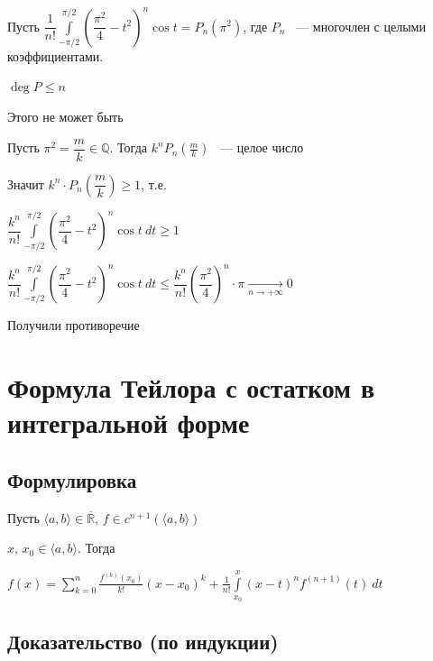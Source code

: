 \documentclass{article}
\begin{document}
			Пусть $\dfrac{1}{n!} \int\limits^{\pi / 2}_{-\pi / 2} \left(\dfrac{\pi^2}{4} - t^2\right)^n \cos t = P_n (\pi^2)$, где $P_n$ ~--- многочлен с целыми коэффициентами.
			
			$\deg P \leq n$
			
			Этого не может быть
			
			Пусть $\pi^2 = \dfrac{m}{k} \in \mathbb{Q}$. Тогда $k^n P_n\left(\frac{m}{k}\right)$ ~--- целое число
			
			Значит $k^n \cdot P_n \left(\dfrac{m}{k}\right) \geq 1$, т.е.
			
			$\dfrac{k^n}{n!} \int\limits^{\pi / 2}_{-\pi / 2} \left(\dfrac{\pi^2}{4} - t^2\right)^n \cos t \ dt \geq 1$
			
			$\dfrac{k^n}{n!} \int\limits^{\pi / 2}_{-\pi / 2} \left(\dfrac{\pi^2}{4} - t^2\right)^n \cos t \ dt \leq \dfrac{k^n}{n!} \left(\dfrac{\pi^2}{4}\right)^n \cdot \pi \xrightarrow[n \rightarrow +\infty]{} 0$
			
			Получили противоречие
			
	\newpage
	
	\newpage

	\section{Формула Тейлора с остатком в интегральной форме}


		\subsection{Формулировка}

			Пусть $\langle a, b \rangle \in \overline{\mathbb{R}}$, $f \in c^{n + 1} (\langle a, b \rangle)$

			$x$, $x_0 \in \langle a, b \rangle$. Тогда

			$f(x) = \sum\limits^n_{k = 0} \frac{f^{(k)} (x_0)}{k!} (x - x_0)^k + \frac{1}{n!} \int\limits^x_{x_0} (x - t)^n f^{(n + 1)}(t) \ dt$

		\subsection{Доказательство (по индукции)}
\end{document}
